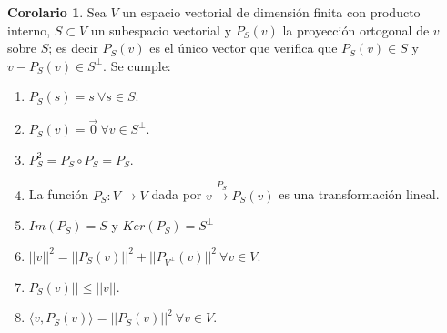 \documentclass[10pt]{article}
\theoremstyle{definition}
\newtheorem{corollary}{Corolario}[theorem]
\begin{document}
\begin{corollary}
	Sea $V$ un espacio vectorial de dimensión finita con producto interno, $S\subset V$ un subespacio vectorial y $P_S(v)$ la proyección ortogonal de $v$ sobre $S$; es decir $P_S(v)$ es el único vector que verifica que $P_S(v)\in S$ y $v-P_S(v)\in S^\bot$. Se cumple:
	\begin{enumerate}
		\item $P_S(s)=s\ \forall s\in S$.
		\item $P_S(v)=\vec{0}\ \forall v\in S^\bot$.
		\item $P_S^2=P_S\circ P_S=P_S$.
		\item La función $P_S:V\to V$ dada por $v\xrightarrow{P_{S}} P_{S}( v)$ es una transformación lineal.
		\item $Im(P_S)=S$ y $Ker(P_S)=S^\bot$
		\item $||v||^2=||P_S(v)||^2+||P_{V^\bot}(v)||^2\ \forall v\in V$.
		\item $P_S(v)||\le ||v||$.
		\item $\langle v,P_S(v)\rangle = ||P_S(v)||^2\ \forall v\in V$.
	\end{enumerate}
\end{corollary}
\end{document}
